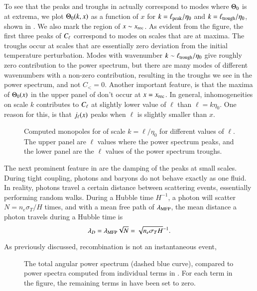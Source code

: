To see that the peaks and troughs in  actually correspond to modes where $\Theta_0$ is at extrema, we plot $\Theta_0(k,x)$ as a function of $x$ for $k=\ell_\mathrm{peak}/\eta_0$ and $k=\ell_\mathrm{trough}/\eta_0$, shown in . We also mark the region of $x\sim x_\mathrm{rec}$.  As evident from the figure, the first three peaks of $C_\ell$ correspond to modes on scales that are at maxima. The troughs occur at scales that are essentially zero deviation from the initial temperature perturbation. Modes with wavenumber $k\sim\ell_\mathrm{trough}/\eta_0$ give roughly zero contribution to the power spectrum, but there are many modes of different wavenumbers with a non-zero contribution, resulting in the troughs we see in the power spectrum, and not $C_{\lt}=0$. Another important feature, is that the maxima of $\Theta_0(x)$ in the upper panel of  don't occur at $x=x_\mathrm{rec}$. In general, inhomogeneities on scale $k$ contributes to $C_\ell$ at slightly lower value of $\ell$ than $\ell=k\eta_0$. One reason for this, is that $j_\ell(x)$ peaks when $\ell$ is slightly smaller than $x$. 
\begin{figure}[ht!] 
    \caption{Computed monopoles for of scale $k=\ell/\eta_0$ for different values of $\ell$. The upper panel are $\ell$ values where the power spectrum peaks, and the lower panel are the $\ell$ values of the power spectrum troughs.}
    \label{fig:M4:results:theta0_at_peaks_and_troughs}
\end{figure}
The next prominent feature in  are the damping of the peaks at small scales. During tight coupling, photons and baryons do not behave exactly as one fluid. In reality, photons travel a certain distance between scattering events, essentially performing random walks. During a Hubble time $H^{-1}$, a photon will scatter $N=n_e \sigma_T / H$ times, and with a mean free path of $\lambda_\mathrm{MFP}$, the mean distance a photon travels during a Hubble time is 
\begin{equation}
    \lambda_D = \lambda_\mathrm{MFP} \sqrt{N} = \sqrt{n_e \sigma_T H}^{-1}.
\end{equation}

As previously discussed, recombination is not an instantaneous event, 

\begin{figure}[ht!]
    \caption{The total angular power spectrum (dashed blue curve), compared to power spectra computed from individual terms in . For each term in the figure, the remaining terms in  have been set to zero.}
    \label{fig:M4:results:cells_components}
\end{figure}

